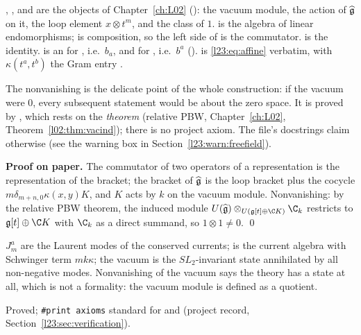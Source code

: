 \begin{dictionary}
, ,  and  are the objects of
Chapter~\ref{ch:L02} (): the vacuum module, the action
of $\widehat{\mathfrak g}$ on it, the loop element $x\otimes t^m$, and the class of $1$.  is
the algebra of linear endomorphisms; \lean{*} is composition, so the left side of  is the
commutator.  is the identity.  is an  for , i.e.\ $b_a$, and
 for , i.e.\ $b^a$ ().
 is \eqref{l23:eq:affine} verbatim, with
$\kappa(t^a,t^b)$ the Gram entry .

The nonvanishing  is the delicate point of the whole construction: if the vacuum were $0$,
every subsequent statement would be about the zero space. It is proved by ,
which rests on the \emph{theorem}  (relative PBW, Chapter~\ref{ch:L02},
Theorem~\ref{l02:thm:vacind}); there is no project axiom. The file's docstrings claim otherwise (see the warning box in Section~\ref{l23:warn:freefield}).
\end{dictionary}

\textbf{Proof on paper.} The commutator of two operators of a representation is the representation of the bracket;
the bracket of $\widehat{\mathfrak g}$ is the loop bracket plus the cocycle $m\delta_{m+n,0}\kappa(x,y)K$, and $K$ acts by
$k$ on the vacuum module. Nonvanishing: by the relative PBW theorem, the induced module
$U(\widehat{\lxxiiig})\otimes_{U(\lxxiiig[t]\oplus\C K)}\C_k$ restricts to $\lxxiiig[t]\oplus\C K$ with $\C_k$ as a direct summand, so
$1\otimes1\ne0$. \qed

\begin{physics}
$J^a_m$ are the Laurent modes of the conserved currents;  is the current algebra with Schwinger
term $mk\kappa$; the vacuum is the $SL_2$-invariant state annihilated by all non-negative modes. Nonvanishing of the
vacuum says the theory has a state at all, which is not a formality: the vacuum module is defined as a quotient.
\end{physics}

\begin{status}
Proved; \texttt{\#print axioms} standard for  and  (project record,
Section~\ref{l23:sec:verification}).
\end{status}

